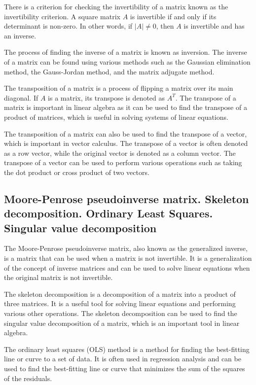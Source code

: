 \documentclass[12pt, a4paper, oneside]{article}
\begin{document}
There is a criterion for checking the invertibility of a matrix known as the invertibility criterion. A square matrix $A$ is invertible if and only if its determinant is non-zero. In other words, if $|A| \ne 0$, then $A$ is invertible and has an inverse.

The process of finding the inverse of a matrix is known as inversion. The inverse of a matrix can be found using various methods such as the Gaussian elimination method, the Gauss-Jordan method, and the matrix adjugate method.

The transposition of a matrix is a process of flipping a matrix over its main diagonal. If $A$ is a matrix, its transpose is denoted as $A^T$. The transpose of a matrix is important in linear algebra as it can be used to find the transpose of a product of matrices, which is useful in solving systems of linear equations.

The transposition of a matrix can also be used to find the transpose of a vector, which is important in vector calculus. The transpose of a vector is often denoted as a row vector, while the original vector is denoted as a column vector. The transpose of a vector can be used to perform various operations such as taking the dot product or cross product of two vectors.





\subsection{ Moore-Penrose pseudoinverse matrix. Skeleton decomposition. Ordinary Least Squares. Singular value decomposition }
The Moore-Penrose pseudoinverse matrix, also known as the generalized inverse, is a matrix that can be used when a matrix is not invertible. It is a generalization of the concept of inverse matrices and can be used to solve linear equations when the original matrix is not invertible.

The skeleton decomposition is a decomposition of a matrix into a product of three matrices. It is a useful tool for solving linear equations and performing various other operations. The skeleton decomposition can be used to find the singular value decomposition of a matrix, which is an important tool in linear algebra.

The ordinary least squares (OLS) method is a method for finding the best-fitting line or curve to a set of data. It is often used in regression analysis and can be used to find the best-fitting line or curve that minimizes the sum of the squares of the residuals.
\end{document}
